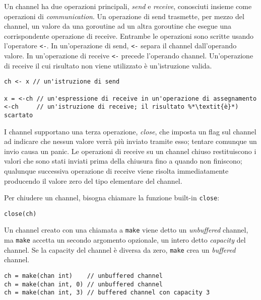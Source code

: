 \documentclass[../../thesis.tex]{subfiles}
\begin{document}
    Un channel ha due operazioni principali, \textit{send} e \textit{receive}, conosciuti insieme come operazioni di \textit{communication}.
    Un operazione di send trasmette, per mezzo del channel, un valore da una goroutine ad un altra goroutine che esegue una corrispondente operazione di receive.
    Entrambe le operazioni sono scritte usando l'operatore \verb"<-".
    In un'operazione di send, \verb"<-" separa il channel dall'operando valore.
    In un'operazione di receive \verb"<-" precede l'operando channel.
    Un'operazione di receive il cui risultato non viene utilizzato è un'istruzione valida.
    \begin{lstlisting}[frame = single,label={lst:lstlisting7-4.2}]
ch <- x // un'istruzione di send

x = <-ch // un'espressione di receive in un'operazione di assegnamento
<-ch     // un'istruzione di receive; il risultato %*\textit{è}*) scartato
    \end{lstlisting}
    I channel supportano una terza operazione, \textit{close}, che imposta un flag sul channel ad indicare che nessun valore verrà più inviato tramite esso;
    tentare comunque un invio causa un panic.
    Le operazioni di receive su un channel chiuso restituiscono i valori che sono stati inviati prima della chiusura fino a quando non finiscono;
    qualunque successiva operazione di receive viene risolta immediatamente producendo il valore zero del tipo elementare del channel.
    \hfill \vspace{12pt}

    Per chiudere un channel, bisogna chiamare la funzione built-in \verb"close":
    \begin{lstlisting}[frame = single,label={lst:lstlisting7-4.3}]
close(ch)
    \end{lstlisting}
    Un channel creato con una chiamata a \verb"make" viene detto un \textit{unbuffered} channel, ma \verb"make" accetta un secondo argomento opzionale, un intero detto \textit{capacity} del channel.
    Se la capacity del channel è diversa da zero, \verb"make" crea un \textit{buffered} channel.
    \begin{lstlisting}[frame = single,label={lst:lstlisting7-4.4}]
ch = make(chan int)    // unbuffered channel
ch = make(chan int, 0) // unbuffered channel
ch = make(chan int, 3) // buffered channel con capacity 3
    \end{lstlisting}
    
    
    
    
\end{document}
